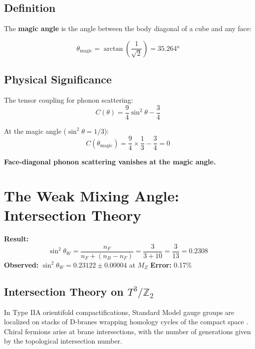 \documentclass[12pt,a4paper]{article}
\newcommand{\Ztwo}{\mathbb{Z}_2}
\newcommand{\Tthree}{T^3}
\newcommand{\sinW}{\sin^2\theta_W}
\newcommand{\nB}{n_B}
\newcommand{\nF}{n_F}
\begin{document}
\subsection{Definition}

The \textbf{magic angle} is the angle between the body diagonal of a cube and any face:

\begin{equation}
\boxed{\theta_{\text{magic}} = \arctan\left(\frac{1}{\sqrt{2}}\right) = 35.264°}
\end{equation}

\subsection{Physical Significance}

The tensor coupling for phonon scattering:
\begin{equation}
C(\theta) = \frac{9}{4}\sin^2\theta - \frac{3}{4}
\end{equation}

At the magic angle ($\sin^2\theta = 1/3$):
\begin{equation}
C(\theta_{\text{magic}}) = \frac{9}{4} \times \frac{1}{3} - \frac{3}{4} = 0
\end{equation}

\textbf{Face-diagonal phonon scattering vanishes at the magic angle.}

\section{The Weak Mixing Angle: Intersection Theory}
\label{sec:weinberg}

\begin{derivedbox}
\textbf{Result:}
\begin{equation}
\sinW = \frac{\nF}{\nF + (\nB - \nF)} = \frac{3}{3 + 10} = \frac{3}{13} = 0.2308
\end{equation}
\textbf{Observed:} $\sinW = 0.23122 \pm 0.00004$ at $M_Z$ \quad \textbf{Error:} 0.17\%
\end{derivedbox}

\subsection{Intersection Theory on $\Tthree/\Ztwo$}

In Type IIA orientifold compactifications, Standard Model gauge groups are localized on stacks of D-branes wrapping homology cycles of the compact space \cite{Ibanez}. Chiral fermions arise at brane intersections, with the number of generations given by the topological intersection number.
\end{document}
